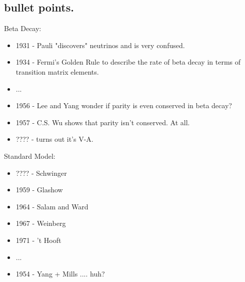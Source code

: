 \subsection{bullet points.}
Beta Decay:
\begin{itemize}
\item 1931 - Pauli "discovers" neutrinos and is very confused.
\item 1934 - Fermi's Golden Rule to describe the rate of beta decay in terms of transition matrix elements.
\item ...
\item 1956 - Lee and Yang wonder if parity is even conserved in beta decay?  
\item 1957 - C.S. Wu shows that parity isn't conserved.  At all.
\item ???? - turns out it's V-A.
\end{itemize}
Standard Model:
\begin{itemize}
\item ???? - Schwinger 
\item 1959 - Glashow
\item 1964 - Salam and Ward
\item 1967 - Weinberg
\item 1971 - 't Hooft
\item ...
\item 1954 - Yang + Mills  .... huh?
\end{itemize}

